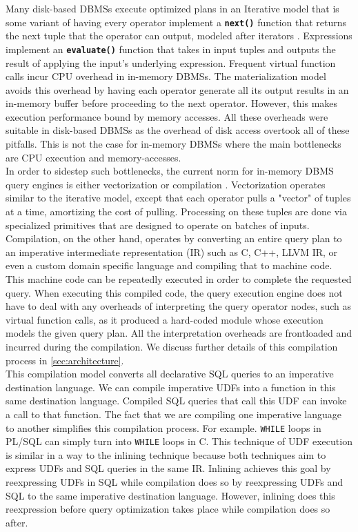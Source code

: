 \documentclass[12pt]{cmuthesis}
\newcommand{\dbSQL}[1]{\texttt{\textbf{#1}}\xspace}
\begin{document}
Many disk-based DBMSs execute optimized plans in an Iterative model that is some variant of having every operator implement a \dbSQL{next()} function that returns the next tuple that the operator can output, modeled after iterators \cite{volcano}. Expressions implement an \dbSQL{evaluate()} function that takes in input tuples and outputs the result of applying the input's underlying expression. Frequent virtual function calls incur CPU overhead in in-memory DBMSs. The materialization model avoids this overhead by having each operator generate all its output results in an in-memory buffer before proceeding to the next operator. However, this makes execution performance bound by memory accesses. All these overheads were suitable in disk-based DBMSs as the overhead of disk access overtook all of these pitfalls. This is not the case for in-memory DBMSs where the main bottlenecks are CPU execution and memory-accesses.\\

In order to sidestep such bottlenecks, the current norm for in-memory DBMS query engines is either vectorization or compilation \cite{kersten18}. Vectorization operates similar to the iterative model, except that each operator pulls a "vector" of tuples at a time, amortizing the cost of pulling. Processing on these tuples are done via specialized primitives that are designed to operate on batches of inputs. Compilation, on the other hand, operates by converting an entire query plan to an imperative intermediate representation (IR) such as C, C++, LLVM IR, or even a custom domain specific language and compiling that to machine code. This machine code can be repeatedly executed in order to complete the requested query. When executing this compiled code, the query execution engine does not have to deal with any overheads of interpreting the query operator nodes, such as virtual function calls, as it produced a hard-coded module whose execution models the given query plan. All the interpretation overheads are frontloaded and incurred during the compilation. We discuss further details of this compilation process in \cref{sec:architecture}.\\

This compilation model converts all declarative SQL queries to an imperative destination language. We can compile imperative UDFs into a function in this same destination language. Compiled SQL queries that call this UDF can invoke a call to that function. The fact that we are compiling one imperative language to another simplifies this compilation process. For example. \texttt{WHILE} loops in PL/SQL can simply turn into \texttt{WHILE} loops in C. This technique of UDF execution is similar in a way to the inlining technique because both techniques aim to express UDFs and SQL queries in the same IR. Inlining achieves this goal by reexpressing UDFs in SQL while compilation does so by reexpressing UDFs and SQL to the same imperative destination language. However, inlining does this reexpression before query optimization takes place while compilation does so after.
\end{document}
